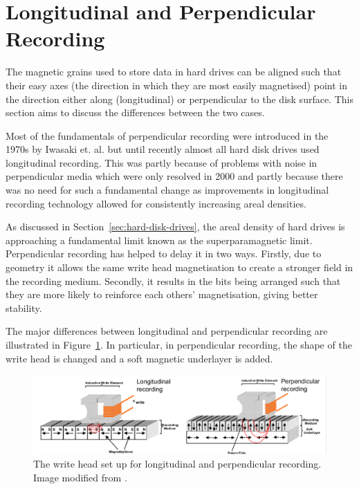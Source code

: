 \section{Longitudinal and Perpendicular Recording}
\label{sec:long-perp-record}

The magnetic grains used to store data in hard drives can be aligned such that
their easy axes (the direction in which they are most easily magnetised) point
in the direction either along (longitudinal) or perpendicular to the disk
surface. This section aims to discuss the differences between the two cases.

Most of the fundamentals of perpendicular recording were introduced in the 1970s
by Iwasaki et. al.\cite{Piramanayagam2009a} but until recently almost all hard
disk drives used longitudinal recording.  This was partly because of problems
with noise in perpendicular media which were only resolved in
2000\cite{Piramanayagam2009a} and partly because there was no need for such a
fundamental change as improvements in longitudinal recording technology allowed
for consistently increasing areal densities.

As discussed in Section~\ref{sec:hard-disk-drives}, the areal density of hard
drives is approaching a fundamental limit known as the superparamagnetic
limit. Perpendicular recording has helped to delay it in two ways. Firstly, due
to geometry it allows the same write head magnetisation to create a stronger
field in the recording medium. Secondly, it results in the bits being arranged
such that they are more likely to reinforce each others' magnetisation, giving
better stability.

The major differences between longitudinal and perpendicular recording are
illustrated in Figure~\ref{fig:Longitudinal-perpendicular}. In particular, in
perpendicular recording, the shape of the write head is changed and a soft magnetic
underlayer is added.

\begin{figure}[!ht]
  \center
  \includegraphics[width=1\textwidth]{./images/perphead}
  \caption{The write head set up for longitudinal and perpendicular recording.
    Image modified from
    \cite{LongitudinalPerpDiagram}.}
  \label{fig:Longitudinal-perpendicular}
\end{figure}

